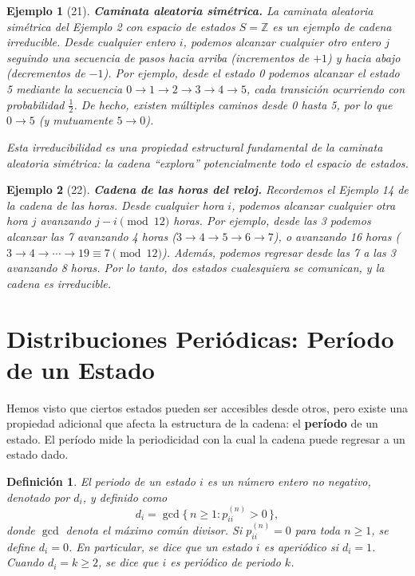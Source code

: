 \documentclass[12pt]{book}
\newtheorem{definition}{Definición}[chapter]
\newtheorem{example}{Ejemplo}[chapter]
\begin{document}
\begin{example}[21]
\textbf{Caminata aleatoria simétrica.} La caminata aleatoria simétrica del Ejemplo 2 con espacio de estados $S = \mathbb{Z}$ es un ejemplo de cadena irreducible. Desde cualquier entero $i$, podemos alcanzar cualquier otro entero $j$ seguindo una secuencia de pasos hacia arriba (incrementos de $+1$) y hacia abajo (decrementos de $-1$). Por ejemplo, desde el estado 0 podemos alcanzar el estado 5 mediante la secuencia $0 \to 1 \to 2 \to 3 \to 4 \to 5$, cada transición ocurriendo con probabilidad $\frac{1}{2}$. De hecho, existen múltiples caminos desde 0 hasta 5, por lo que $0 \to 5$ (y mutuamente $5 \to 0$).

Esta irreducibilidad es una propiedad estructural fundamental de la caminata aleatoria simétrica: la cadena ``explora'' potencialmente todo el espacio de estados.
\end{example}

\begin{example}[22]
\textbf{Cadena de las horas del reloj.} Recordemos el Ejemplo 14 de la cadena de las horas. Desde cualquier hora $i$, podemos alcanzar cualquier otra hora $j$ avanzando $j - i \pmod{12}$ horas. Por ejemplo, desde las 3 podemos alcanzar las 7 avanzando 4 horas ($3 \to 4 \to 5 \to 6 \to 7$), o avanzando 16 horas ($3 \to 4 \to \cdots \to 19 \equiv 7 \pmod{12}$). Además, podemos regresar desde las 7 a las 3 avanzando 8 horas. Por lo tanto, dos estados cualesquiera se comunican, y la cadena es irreducible.
\end{example}

\section{Distribuciones Periódicas: Período de un Estado}

Hemos visto que ciertos estados pueden ser accesibles desde otros, pero existe una propiedad adicional que afecta la estructura de la cadena: el \textbf{período} de un estado. El período mide la periodicidad con la cual la cadena puede regresar a un estado dado.

\begin{definition}
El \emph{periodo} de un estado $i$ es un número entero no negativo,
denotado por $d_i$, y definido como
\[
d_i = \gcd \{\, n \ge 1 : p_{ii}^{(n)} > 0 \,\},
\]
donde $\gcd$ denota el máximo común divisor. Si $p_{ii}^{(n)} = 0$ para toda $n \ge 1$, se define $d_i = 0$. En particular, se dice que un estado $i$ es \emph{aperiódico} si $d_i = 1$.
Cuando $d_i = k \ge 2$, se dice que $i$ es \emph{periódico de periodo $k$}.
\end{definition}
\end{document}
